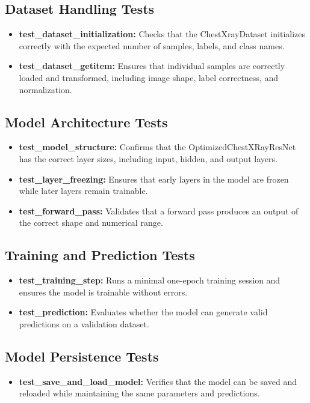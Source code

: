 \documentclass[12pt, titlepage]{article}
\begin{document}
\subsection{Dataset Handling Tests}
\begin{itemize}
    \item \textbf{test\_dataset\_initialization:} Checks that the ChestXrayDataset initializes correctly with the expected number of samples, labels, and class names.
    \item \textbf{test\_dataset\_getitem:} Ensures that individual samples are correctly loaded and transformed, including image shape, label correctness, and normalization.
\end{itemize}

\subsection{Model Architecture Tests}
\begin{itemize}
    \item \textbf{test\_model\_structure:} Confirms that the OptimizedChestXRayResNet has the correct layer sizes, including input, hidden, and output layers.
    \item \textbf{test\_layer\_freezing:} Ensures that early layers in the model are frozen while later layers remain trainable.
    \item \textbf{test\_forward\_pass:} Validates that a forward pass produces an output of the correct shape and numerical range.
\end{itemize}

\subsection{Training and Prediction Tests}
\begin{itemize}
    \item \textbf{test\_training\_step:} Runs a minimal one-epoch training session and ensures the model is trainable without errors.
    \item \textbf{test\_prediction:} Evaluates whether the model can generate valid predictions on a validation dataset.
\end{itemize}

\subsection{Model Persistence Tests}
\begin{itemize}
    \item \textbf{test\_save\_and\_load\_model:} Verifies that the model can be saved and reloaded while maintaining the same parameters and predictions.
\end{itemize}
\end{document}
